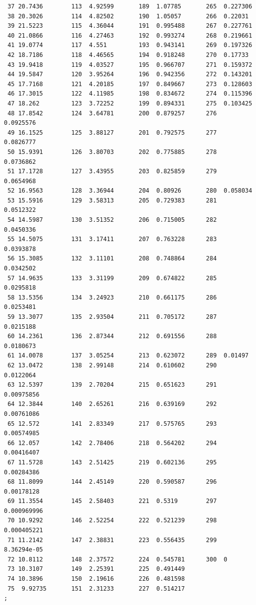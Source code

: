 \documentclass{article}
\begin{document}
\begin{verbatim}
 37 20.7436        113  4.92599       189  1.07785       265  0.227306
 38 20.3026        114  4.82502       190  1.05057       266  0.22031
 39 21.5223        115  4.36044       191  0.995488      267  0.227761
 40 21.0866        116  4.27463       192  0.993274      268  0.219661
 41 19.0774        117  4.551         193  0.943141      269  0.197326
 42 18.7186        118  4.46565       194  0.918248      270  0.17733
 43 19.9418        119  4.03527       195  0.966707      271  0.159372
 44 19.5847        120  3.95264       196  0.942356      272  0.143201
 45 17.7168        121  4.20185       197  0.849667      273  0.128603
 46 17.3015        122  4.11985       198  0.834672      274  0.115396
 47 18.262         123  3.72252       199  0.894331      275  0.103425
 48 17.8542        124  3.64781       200  0.879257      276  0.0925576
 49 16.1525        125  3.88127       201  0.792575      277  0.0826777
 50 15.9391        126  3.80703       202  0.775885      278  0.0736862
 51 17.1728        127  3.43955       203  0.825859      279  0.0654968
 52 16.9563        128  3.36944       204  0.80926       280  0.058034
 53 15.5916        129  3.58313       205  0.729383      281  0.0512322
 54 14.5987        130  3.51352       206  0.715005      282  0.0450336
 55 14.5075        131  3.17411       207  0.763228      283  0.0393878
 56 15.3085        132  3.11101       208  0.748864      284  0.0342502
 57 14.9635        133  3.31199       209  0.674822      285  0.0295818
 58 13.5356        134  3.24923       210  0.661175      286  0.0253481
 59 13.3077        135  2.93504       211  0.705172      287  0.0215188
 60 14.2361        136  2.87344       212  0.691556      288  0.0180673
 61 14.0078        137  3.05254       213  0.623072      289  0.01497
 62 13.0472        138  2.99148       214  0.610602      290  0.0122064
 63 12.5397        139  2.70204       215  0.651623      291  0.00975856
 64 12.3844        140  2.65261       216  0.639169      292  0.00761086
 65 12.572         141  2.83349       217  0.575765      293  0.00574985
 66 12.057         142  2.78406       218  0.564202      294  0.00416407
 67 11.5728        143  2.51425       219  0.602136      295  0.00284386
 68 11.8099        144  2.45149       220  0.590587      296  0.00178128
 69 11.3554        145  2.58403       221  0.5319        297  0.000969996
 70 10.9292        146  2.52254       222  0.521239      298  0.000405221
 71 11.2142        147  2.38831       223  0.556435      299  8.36294e-05
 72 10.8112        148  2.37572       224  0.545781      300  0
 73 10.3107        149  2.25391       225  0.491449
 74 10.3896        150  2.19616       226  0.481598
 75  9.92735       151  2.31233       227  0.514217
;

\end{verbatim}
\normalsize
\end{document}
